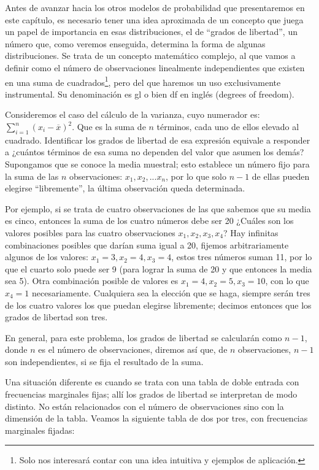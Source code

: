 \documentclass[]{article}
\let\rmarkdownfootnote\footnote%
\def\footnote{\protect\rmarkdownfootnote}
\begin{document}
Antes de avanzar hacia los otros modelos de probabilidad que
presentaremos en este capítulo, es necesario tener una idea aproximada
de un concepto que juega un papel de importancia en esas distribuciones,
el de ``grados de libertad'', un número que, como veremos enseguida,
determina la forma de algunas distribuciones. Se trata de un concepto
matemático complejo, al que vamos a definir como el número de
observaciones linealmente independientes que existen en una suma de
cuadrados\footnote{Solo nos interesará contar con una idea intuitiva y
  ejemplos de aplicación.}, pero del que haremos un uso exclusivamente
instrumental. Su denominación es gl o bien df en inglés (degrees of
freedom).

Consideremos el caso del cálculo de la varianza, cuyo numerador es:
\(\sum_{i = 1}^{n}(x_{i} - \overline{x})^{2}\). Que es la suma de \(n\)
términos, cada uno de ellos elevado al cuadrado. Identificar los grados
de libertad de esa expresión equivale a responder a ¿cuántos términos de
esa suma no dependen del valor que asumen los demás? Supongamos que se
conoce la media muestral; esto establece un número fijo para la suma de
las \(n\) observaciones: \(x_{1}, x_{2}, ... x_{n}\), por lo que solo
\(n-1\) de ellas pueden elegirse ``libremente'', la última observación
queda determinada.

Por ejemplo, si se trata de cuatro observaciones de las que sabemos que
su media es cinco, entonces la suma de los cuatro números debe ser 20
¿Cuáles son los valores posibles para las cuatro observaciones
\(x_{1}, x_{2}, x_{3}, x_{4}\)? Hay infinitas combinaciones posibles que
darían suma igual a 20, fijemos arbitrariamente algunos de los valores:
\(x_{1}=3, x_{2}=4, x_{3}=4\), estos tres números suman 11, por lo que
el cuarto solo puede ser 9 (para lograr la suma de 20 y que entonces la
media sea 5). Otra combinación posible de valores es
\(x_{1}=4, x_{2}=5, x_{3}=10\), con lo que \(x_{4}=1\) necesariamente.
Cualquiera sea la elección que se haga, siempre serán tres de los cuatro
valores los que puedan elegirse libremente; decimos entonces que los
grados de libertad son tres.

En general, para este problema, los grados de libertad se calcularán
como \(n-1\), donde \(n\) es el número de observaciones, diremos así
que, de \(n\) observaciones, \(n-1\) son independientes, si se fija el
resultado de la suma.

Una situación diferente es cuando se trata con una tabla de doble
entrada con frecuencias marginales fijas; allí los grados de libertad se
interpretan de modo distinto. No están relacionados con el número de
observaciones sino con la dimensión de la tabla. Veamos la siguiente
tabla de dos por tres, con frecuencias marginales fijadas:
\end{document}
